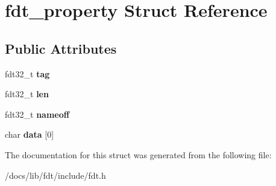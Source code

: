 \hypertarget{structfdt__property}{}\section{fdt\+\_\+property Struct Reference}
\label{structfdt__property}
\subsection*{Public Attributes}
\begin{DoxyCompactItemize}
\item 
\mbox{\label{structfdt__property_a6c0d0fd0e741c931f7b3ca1482193740}} 
fdt32\+\_\+t {\bfseries tag}
\item 
\mbox{\label{structfdt__property_a48e6236319453578c3ca7c106b382a2f}} 
fdt32\+\_\+t {\bfseries len}
\item 
\mbox{\label{structfdt__property_ad5753794266beffe67b79b6e5b3ab352}} 
fdt32\+\_\+t {\bfseries nameoff}
\item 
\mbox{\label{structfdt__property_a32114ac9139f0cf9b17e3592088a23fa}} 
char {\bfseries data} \mbox{[}0\mbox{]}
\end{DoxyCompactItemize}


The documentation for this struct was generated from the following file\+:\begin{DoxyCompactItemize}
\item 
/docs/lib/fdt/include/fdt.\+h\end{DoxyCompactItemize}
